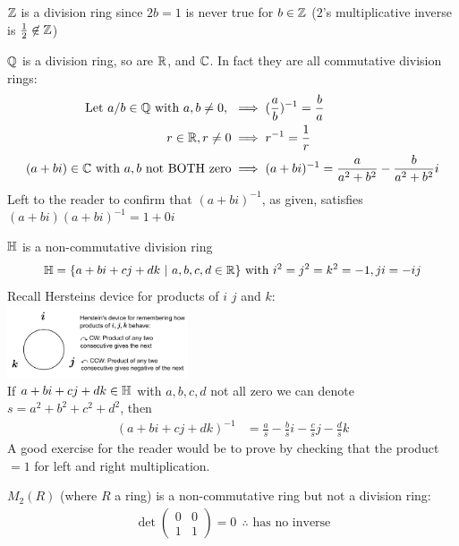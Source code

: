 \begin{example}
    ${\mathbb{ Z}}$ is  a division ring since $2b=1$ is never true for $b\in {\mathbb{ Z}}$ ($2$'s multiplicative inverse is $\frac{1}{2} \not \in {\mathbb{ Z}}$)
\end{example}
\begin{example}
    ${\mathbb{ Q}}$ is a division ring, so are ${\mathbb{ R}}$, and ${\mathbb{ C}}$. In fact they are all commutative division rings: \steezybreak\\
    
    \begin{align}
        \text{Let }  a/b \in \Q \text{ with } a,b\neq 0,  \ &\implies (\frac{a}{b})^{-1} = \frac{b}{a} \nonumber \\
        r \in \R, r\neq 0 &\implies r^{-1}=\frac{1}{r} \nonumber \\
        (a+bi)\in \C \text{ with $a,b$ not BOTH zero} &\implies (a+bi)^{-1} = \frac{a}{a^2+b^2} - \frac{b}{a^2+b^2}i \nonumber
    \end{align}
    Left to the reader to confirm that $(a+bi)^{-1}$, as given, satisfies $(a+bi)(a+bi)^{-1} = 1+0i$
\end{example}

\begin{example}
    ${\mathbb{ H}}$ is a non-commutative division ring
    \begin{align}
        {\mathbb{ H}} = \{a+bi+cj+dk \ | \ a,b,c,d \in {\mathbb{ R}} \} \text{ with } i^2=j^2=k^2=-1, ji = -ij \nonumber
    \end{align}
    Recall Hersteins device for products of $i$ $j$ and $k$: \includegraphics[width= 0.4\textwidth]{Figures/Herstein_quat_device.pdf} \steezybreak\\
    \noindent If $a+bi+cj+dk \in {\mathbb{ H}}$ with $a,b,c,d$ not all zero we can denote $s= a^2+b^2+c^2+d^2$, then
    \begin{align}
        (a+bi+cj+dk)^{-1}&= \frac{a}{s} - \frac{b}{s}i - \frac{c}{s}j - \frac{d}{s}k\nonumber
    \end{align}
    A good exercise for the reader would be to prove by checking that the product $=1$ for left and right multiplication.
\end{example}

\begin{example} 
    $M_2(R)$ (where $R$ a ring) is a non-commutative ring but not a division ring:
    \begin{align}
        \det\begin{pmatrix}
            0&0\\1&1
        \end{pmatrix} = 0 \ \ \therefore \text{ has no inverse} \nonumber
    \end{align}
\end{example}


